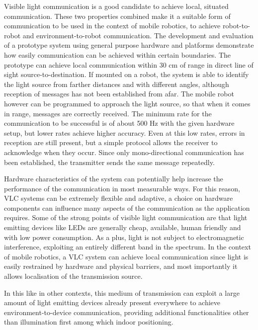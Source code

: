 %
Visible light communication is a good candidate to achieve local, situated communication.
These two properties combined make it a suitable form of communication to be used in the context of mobile robotics, to achieve robot-to-robot and environment-to-robot communication.
The development and evaluation of a prototype system using general purpose hardware and platforms demonstrate how easily communication can be achieved within certain boundaries.
The prototype can achieve local communication within 30 cm of range in direct line of sight source-to-destination.
If mounted on a robot, the system is able to identify the light source from farther distances and with different angles, although reception of messages has not been established from afar.
The mobile robot however can be programmed to approach the light source, so that when it comes in range, messages are correctly received.
The minimum rate for the communication to be successful is of about 500 Hz with the given hardware setup, but lower rates achieve higher accuracy.
Even at this low rates, errors in reception are still present, but a simple protocol allows the receiver to acknowledge when they occur.
Since only mono-directional communication has been established, the transmitter sends the same message repeatedly.

Hardware characteristics of the system can potentially help increase the performance of the communication in most measurable ways.
For this reason, VLC systems can be extremely flexible and adaptive, a choice on hardware components can influence many aspects of the communication as the application requires.
Some of the strong points of visible light communication are that light emitting devices like LEDs are generally cheap, available, human friendly and with low power consumption.
As a plus, light is not subject to electromagnetic interference, exploiting an entirely different band in the spectrum.
In the context of mobile robotics, a VLC system can achieve local communication since light is easily restrained by hardware and physical barriers, and most importantly it allows localisation of the transmission source.

In this like in other contexts, this medium of transmission can exploit a large amount of light emitting devices already present everywhere to achieve environment-to-device communication, providing additional functionalities other than illumination first among which indoor positioning.

